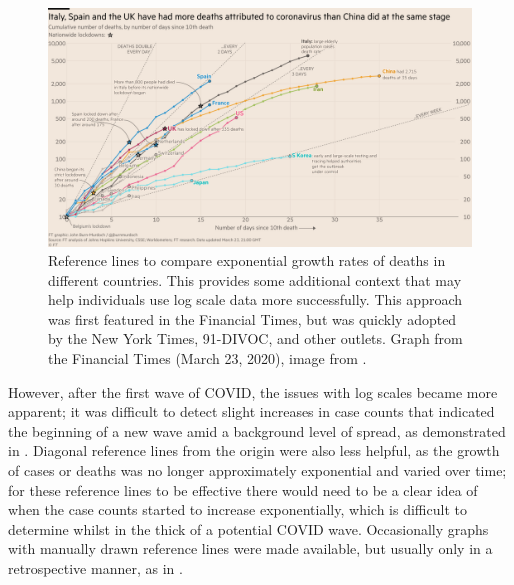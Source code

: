 \documentclass[article]{jdssv}\usepackage[]{graphicx}\usepackage[]{color}
\begin{document}
\begin{figure}
\centering
\includegraphics[width=.8\linewidth]{ft-COVID-19-deaths}
\caption{Reference lines to compare exponential growth rates of deaths in different countries. This provides some additional context that may help individuals use log scale data more successfully. This approach was first featured in the Financial Times, but was quickly adopted by the New York Times, 91-DIVOC, and other outlets. Graph from the Financial Times (March 23, 2020), image from \citet{kosaraPraiseDiagonalReference2020}.}
\label{fig:diag-ref-lines}
\end{figure}

However, after the first wave of COVID, the issues with log scales became more apparent; it was difficult to detect slight increases in case counts that indicated the beginning of a new wave amid a background level of spread, as demonstrated in  . Diagonal reference lines from the origin were also less helpful, as the growth of cases or deaths was no longer approximately exponential and varied over time; for these reference lines to be effective there would need to be a clear idea of when the case counts started to increase exponentially, which is difficult to determine whilst in the thick of a potential COVID wave. Occasionally graphs with manually drawn reference lines were made available, but usually only in a retrospective manner, as in . 
\end{document}
